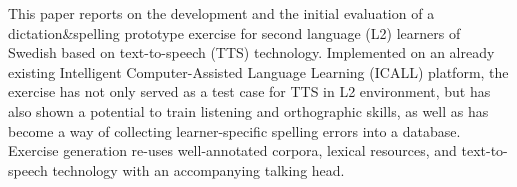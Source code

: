 This paper reports on the development and the initial evaluation of a dictation\&spelling prototype exercise for second language (L2) learners of Swedish based on text-to-speech (TTS) technology. Implemented on an already existing Intelligent Computer-Assisted Language Learning (ICALL) platform, the exercise has not only served as a test case for TTS in L2 environment, but has also shown a potential to train listening and orthographic skills, as well as has become a way of collecting learner-specific spelling errors into a database. Exercise generation re-uses well-annotated corpora, lexical resources, and text-to-speech technology with an accompanying talking head.
